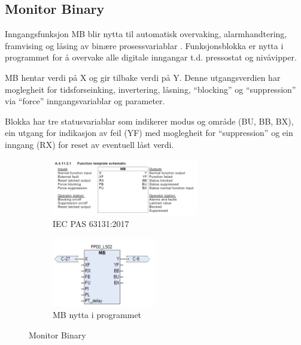 \newpage

\subsection{Monitor Binary}
Inngangsfunksjon \gls{MB} blir nytta til automatisk overvaking, alarmhandtering, framvising og låsing av binære prosessvariablar \citep{IEC-63131}.
Funksjonsblokka er nytta i programmet for å overvake alle digitale inngangar t.d. pressostat og nivåvipper.

\gls{MB} hentar verdi på X og gir tilbake verdi på Y. \newline
Denne utgangsverdien har moglegheit for tidsforseinking, invertering, låsning, ``blocking'' og ``suppression'' via ``force'' inngangsvariablar og parameter.

Blokka har tre statusvariablar som indikerer modus og område (BU, BB, BX), ein utgang for indikasjon av feil (YF) med moglegheit for ``suppression''
og ein inngang (RX) for reset av eventuell låst verdi. \newline 

\begin{figure}[htbp]
    \centering
    \begin{subfigure}[b]{1\textwidth}
        \centering
        \includegraphics[width=0.7\textwidth]{Bilder/MBBlokkIEC.png}
        \caption{\gls{IEC} \gls{PAS} 63131:2017 \citep{MB}}\label{fig:Monitor Binary blokk IEC}
    \end{subfigure}
    \hfill
    \begin{subfigure}[b]{1\textwidth}
        \centering
        \includegraphics[width=0.5\textwidth]{Bilder/MBBlokkIProgrammet.png}
        \caption{MB nytta i programmet}\label{fig:Monitor Binary blokk i programmet}
    \end{subfigure}
    \caption{Monitor Binary}\label{fig:Monitor Binary}
\end{figure}

